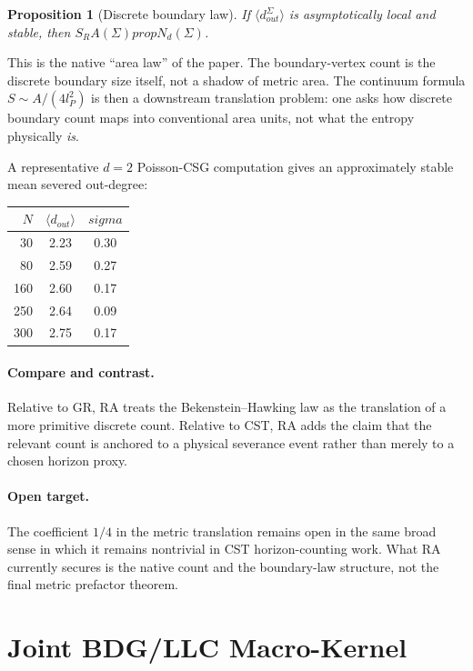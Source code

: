 \documentclass[11pt]{article}
\def\ell{l}%
\def\sigma{sigma}%
\def\mathrm#1{#1}%
\def\partial{d}%
\def\propto{prop}%
\def\SRa{S_RA}%
\newtheorem{proposition}{Proposition}
\newcommand{\SRa}{\ensuremath{S_{\mathrm{RA}}}}
\begin{document}
\begin{proposition}[Discrete boundary law]
If $\langle d_{\mathrm{out}}^\Sigma\rangle$ is asymptotically local and stable, then $\SRa(\Sigma)\propto N_\partial(\Sigma)$.
\end{proposition}

This is the native ``area law'' of the paper. The boundary-vertex count is the discrete boundary size itself, not a shadow of metric area. The continuum formula $S\sim A/(4\ell_P^2)$ is then a downstream translation problem: one asks how discrete boundary count maps into conventional area units, not what the entropy physically \emph{is}.

A representative $d=2$ Poisson-CSG computation gives an approximately stable mean severed out-degree:

\begin{center}
\begin{tabular}{rcc}
\toprule
$N$ & $\langle d_{\mathrm{out}}\rangle$ & $\sigma$ \\
\midrule
30 & 2.23 & 0.30 \\
80 & 2.59 & 0.27 \\
160 & 2.60 & 0.17 \\
250 & 2.64 & 0.09 \\
300 & 2.75 & 0.17 \\
\bottomrule
\end{tabular}
\end{center}

\paragraph{Compare and contrast.} Relative to GR, RA treats the Bekenstein--Hawking law as the translation of a more primitive discrete count. Relative to CST, RA adds the claim that the relevant count is anchored to a physical severance event rather than merely to a chosen horizon proxy.

\paragraph{Open target.} The coefficient $1/4$ in the metric translation remains open in the same broad sense in which it remains nontrivial in CST horizon-counting work. What RA currently secures is the native count and the boundary-law structure, not the final metric prefactor theorem.

\section{Joint BDG/LLC Macro-Kernel}
\label{sec:macro_kernel}
\end{document}
